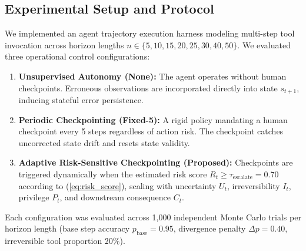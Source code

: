 \documentclass[conference]{IEEEtran}
\begin{document}
\subsection{Experimental Setup and Protocol}
We implemented an agent trajectory execution harness modeling multi-step tool invocation across horizon lengths $n \in \{5, 10, 15, 20, 25, 30, 40, 50\}$. We evaluated three operational control configurations:
\begin{enumerate}
    \item \textbf{Unsupervised Autonomy (None):} The agent operates without human checkpoints. Erroneous observations are incorporated directly into state $s_{t+1}$, inducing stateful error persistence.
    \item \textbf{Periodic Checkpointing (Fixed-5):} A rigid policy mandating a human checkpoint every 5 steps regardless of action risk. The checkpoint catches uncorrected state drift and resets state validity.
    \item \textbf{Adaptive Risk-Sensitive Checkpointing (Proposed):} Checkpoints are triggered dynamically when the estimated risk score $R_t \ge \tau_{\text{escalate}} = 0.70$ according to (\ref{eq:risk_score}), scaling with uncertainty $U_t$, irreversibility $I_t$, privilege $P_t$, and downstream consequence $C_t$.
\end{enumerate}

Each configuration was evaluated across 1,000 independent Monte Carlo trials per horizon length (base step accuracy $p_{\text{base}} = 0.95$, divergence penalty $\Delta p = 0.40$, irreversible tool proportion 20\%).
\end{document}
